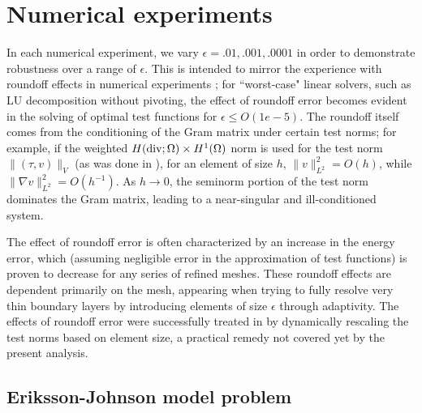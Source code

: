 \documentclass[11pt,onecolumn]{scrartcl}
\newcommand{\grad}{\nabla}
\begin{document}
\section{Numerical experiments}
\label{sec:num_exp}

In each numerical experiment, we vary $\epsilon = .01, .001, .0001$ in order to demonstrate robustness over a range of $\epsilon$.  This is intended to mirror the experience with roundoff effects in numerical experiments \cite{DPGrobustness}; for ``worst-case" linear solvers, such as LU decomposition without pivoting, the effect of roundoff error becomes evident in the solving of optimal test functions for $\epsilon \leq O(1e-5)$.  The roundoff itself comes from the conditioning of the Gram matrix under certain test norms; for example, if the weighted $H({\rm div};\Omega)\times H^1(\Omega)$ norm is used for the test norm $\|\left(\tau,v\right)\|_V$ (as was done in \cite{DPG2}), for an element of size $h$, $\|v\|_{L^2}^2 = O(h)$, while $\|\grad v\|_{L^2}^2 = O(h^{-1})$. As $h\rightarrow 0$, the seminorm portion of the test norm dominates the Gram matrix, leading to a near-singular and ill-conditioned system. 

The effect of roundoff error is often characterized by an increase in the energy error, which (assuming negligible error in the approximation of test functions) is proven to decrease for any series of refined meshes. These roundoff effects are dependent primarily on the mesh, appearing when trying to fully resolve very thin boundary layers by introducing elements of size $\epsilon$ through adaptivity. The effects of roundoff error were successfully treated in \cite{DPG3} by dynamically rescaling the test norms based on element size, a practical remedy not covered yet by the present analysis. 

\subsection{Eriksson-Johnson model problem}
\end{document}
